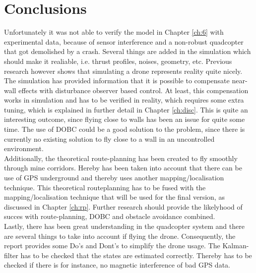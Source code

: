 \chapter{Conclusions}
Unfortunately it was not able to verify the model in Chapter \ref{ch:6} with experimental data, because of sensor interference and a non-robust quadcopter that got demolished by a crash. Several things are added in the simulation which should make it realiable, i.e. thrust profiles, noises, geometry, etc. Previous research however shows that simulating a drone represents reality quite nicely. The simulation has provided information that it is possible to compensate near-wall effects with disturbance observer based control. At least, this compensation works in simulation and has to be verified in reality, which requires some extra tuning, which is explained in further detail in Chapter \ref{ch:disc}. This is quite an interesting outcome, since flying close to walls has been an issue for quite some time. The use of DOBC could be a good solution to the problem, since there is currently no existing solution to fly close to a wall in an uncontrolled environment.\\

Additionally, the theoretical route-planning has been created to fly smoothly through mine corridors. Hereby has been taken into account that there can be use of GPS underground and thereby uses another mapping/localisation technique. This theoretical routeplanning has to be fused with the mapping/localisation technique that will be used for the final version, as discussed in Chapter \ref{ch:rp}. Further research should provide the likelyhood of succes with route-planning, DOBC and obstacle avoidance combined.\\

Lastly, there has been great understanding in the quadcopter system and there are several things to take into account if flying the drone. Consequently, the report provides some Do's and Dont's to simplify the drone usage. The Kalman-filter has to be checked that the states are estimated correctly. Thereby has to be checked if there is for instance, no magnetic interference of bad GPS data.\\